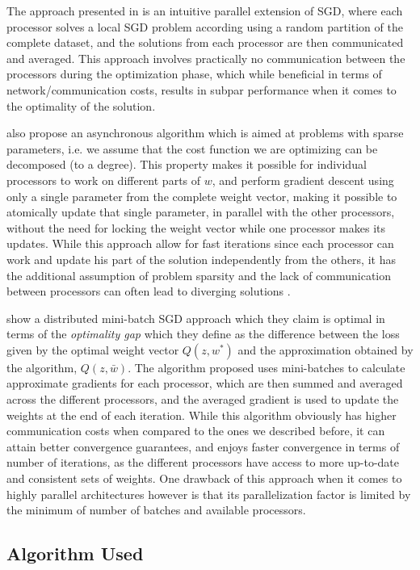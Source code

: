 \documentclass[11pt,a4paper]{article}
\begin{document}
The approach presented in \cite{zinkevich2010parallelized} is an intuitive parallel extension of SGD, where each processor solves a local SGD problem according using a random partition of the complete dataset, and the solutions from each processor are then communicated and averaged. This approach involves practically no communication between the processors during the optimization phase, which while beneficial in terms of network/communication costs, results in subpar performance when it comes to the optimality of the solution.
 
\cite{recht2011hogwild} also propose an asynchronous algorithm which is aimed at problems with sparse parameters, i.e. we assume that the cost function we are optimizing can be decomposed (to a degree). This property makes it possible for individual processors to work on different parts of $w$, and perform gradient descent using only a single parameter from the complete weight vector, making it possible to atomically update that single parameter, in parallel with the other processors, without the need for locking the weight vector while one processor makes its updates.
While this approach allow for fast iterations since each processor can work and update his part of the solution independently from the others, it has the additional assumption of problem sparsity and the lack of communication between processors can often lead to diverging solutions \cite{dai2015analysis}.

\cite{dekel2012optimal} show a distributed mini-batch SGD approach which they claim is optimal in terms of the \textit{optimality gap} which they define as the difference between the loss given by the optimal weight vector $Q(z, w^*)$ and the approximation obtained by the algorithm, $Q(z, \bar{w})$. The algorithm proposed uses mini-batches to calculate approximate gradients for each processor, which are then summed and averaged across the different processors, and the averaged gradient is used to update the weights at the end of each iteration. While this algorithm obviously has higher communication costs when compared to the ones we described before,
it can attain better convergence guarantees, and enjoys faster convergence in terms of number of iterations, as the different processors have access to more up-to-date and consistent sets of weights. One drawback of this approach when it comes to highly parallel architectures however is that its parallelization factor is limited by the minimum of number of batches and available processors.

\subsection{Algorithm Used}
\end{document}
